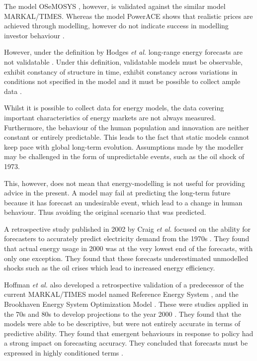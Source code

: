 \documentclass[final,3p,times,twocolumn,numbers]{elsarticle}
\begin{document}
The model OSeMOSYS \cite{Howells2011}, however, is validated against the similar model MARKAL\slash TIMES.  Whereas the model PowerACE shows that realistic prices are achieved through modelling, however do not indicate success in modelling investor behaviour \cite{Ringler2012}.

However, under the definition by Hodges \textit{et al.} \cite{Hodges} long-range energy forecasts are not validatable \cite{Craig2002}. Under this definition, validatable models must be observable, exhibit constancy of structure in time, exhibit constancy across variations in conditions not specified in the model and it must be possible to collect ample data \cite{Hodges}.

Whilst it is possible to collect data for energy models, the data covering important characteristics of energy markets are not always measured. Furthermore, the behaviour of the human population and innovation are neither constant or entirely predictable. This leads to the fact that static models cannot keep pace with global long-term evolution. Assumptions made by the modeller may be challenged in the form of unpredictable events, such as the oil shock of 1973.

This, however, does not mean that energy-modelling is not useful for providing advice in the present. A model may fail at predicting the long-term future because it has forecast an undesirable event, which lead to a change in human behaviour. Thus avoiding the original scenario that was predicted.

A retrospective study published in 2002 by Craig \textit{et al.} focused on the ability for forecasters to accurately predict electricity demand from the 1970s \cite{Craig2002}. They found that actual energy usage in 2000 was at the very lowest end of the forecasts, with only one exception. They found that these forecasts underestimated unmodelled shocks such as the oil crises which lead to increased energy efficiency.

Hoffman \textit{et al.} also developed a retrospective validation of a predecessor of the current MARKAL\slash TIMES model named Reference Energy System \cite{Hoffman_1973}, and the Brookhaven Energy System Optimization Model \cite{ERDA_48}. These were studies applied in the 70s and 80s to develop projections to the year 2000 . They found that the models were able to be descriptive, but were not entirely accurate in terms of predictive ability. They found that emergent behaviours in response to policy had a strong impact on forecasting accuracy. They concluded that forecasts must be expressed in highly conditioned terms \cite{Hoffman2011}. 
\end{document}
